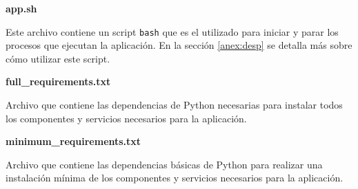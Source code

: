 \newpage

\textbf{app.sh}

Este archivo contiene un script \texttt{bash} que es el utilizado para iniciar y parar los procesos que ejecutan la aplicación. En la sección \ref{anex:desp} se detalla más sobre cómo utilizar este script.

\textbf{full\_requirements.txt}

Archivo que contiene las dependencias de Python necesarias para instalar todos los componentes y servicios necesarios para la aplicación.

\textbf{minimum\_requirements.txt}

Archivo que contiene las dependencias básicas de Python para realizar una instalación mínima de los componentes y servicios necesarios para la aplicación.

